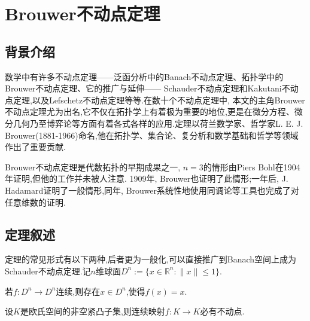 \documentclass[main]{subfiles}
\newcommand{\mr}{\mathbb{R}}
\renewcommand{\leq}{\leqslant}
\begin{document}
\renewcommand{\filename}{14. Brouwer不动点定理}%
\section{Brouwer不动点定理}
\subsection*{背景介绍}
数学中有许多不动点定理——泛函分析中的Banach不动点定理、拓扑学中的Brouwer不动点定理、它的推广与延伸—— Schauder不动点定理和Kakutani不动点定理,以及Lefschetz不动点定理等等.在数十个不动点定理中, 本文的主角Brouwer不动点定理尤为出名,它不仅在拓扑学上有着极为重要的地位,更是在微分方程、微分几何乃至博弈论等方面有着各式各样的应用.定理以荷兰数学家、哲学家L. E. J. Brouwer(1881-1966)命名,他在拓扑学、集合论、复分析和数学基础和哲学等领域作出了重要贡献.

Brouwer不动点定理是代数拓扑的早期成果之一, $n=3$的情形由Piers Bohl在1904年证明,但他的工作并未被人注意. 1909年, Brouwer也证明了此情形;一年后, J. Hadamard证明了一般情形,同年, Brouwer系统性地使用同调论等工具也完成了对任意维数的证明.
\subsection*{定理叙述}
定理的常见形式有以下两种,后者更为一般化,可以直接推广到Banach空间上成为Schauder不动点定理.记$n$维球面$D^n:=\{x\in\mr^n:\|x\|\leq1\}$.
\begin{theorem}\label{thm:1}
	若$f:D^n\to D^n$连续,则存在$x\in D^n$,使得$f(x)=x$.
\end{theorem}
\begin{theorem}\label{thm:2}
	设$K$是欧氏空间的非空紧凸子集,则连续映射$f:K\to K$必有不动点.
\end{theorem}
\end{document}
